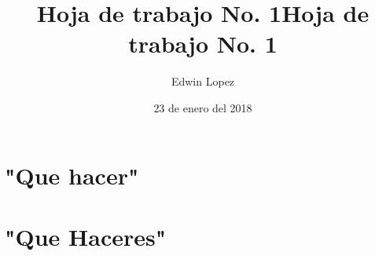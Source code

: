 \documentclass[10pt,a4paper]{article}
\author{Edwin Lopez}
\title{Hoja de trabajo No. 1}
\date {23 de enero del 2018}
\begin{document}
\title{Hoja de trabajo No. 1}
\maketitle
\section{"Que hacer"}
\section{"Que Haceres"}
\end{document}
